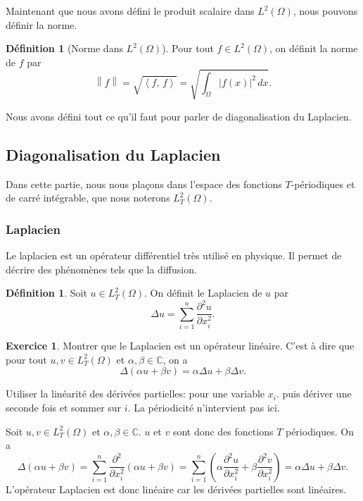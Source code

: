 \documentclass[11pt,a4paper]{article}
\numberwithin{equation}{section}
\theoremstyle{plain}
\theoremstyle{definition}
\newtheorem{definition}[theorem]{Définition}
\newtheorem{exercise}[theorem]{Exercice}
\theoremstyle{remark}
\newcommand{\C}{\mathbb{C}}
\newcommand{\norm}[1]{\left\lVert #1\right\rVert}
\newcommand{\ip}[2]{\left\langle #1,\, #2\right\rangle}
\newcommand{\Lap}{\Delta}
\begin{document}
Maintenant que nous avons défini le produit scalaire dans $L^2(\Omega)$, nous pouvons définir la norme.

\begin{definition}[Norme dans $L^2(\Omega)$]
Pour tout $f \in L^2(\Omega)$, on définit la norme de $f$ par
\[
    \norm{f} = \sqrt{\ip{f}{f}} = \sqrt{\int_\Omega |f(x)|^2 \, dx}.
\]
\end{definition}

Nous avons défini tout ce qu'il faut pour parler de diagonalisation du Laplacien.

\subsection{Diagonalisation du Laplacien}

Dans cette partie, nous nous plaçons dans l'espace des fonctions $T$-périodiques et de carré intégrable, que nous noterons $L^2_T(\Omega)$.

\subsubsection{Laplacien}

Le laplacien est un opérateur différentiel très utilisé en physique. Il permet de décrire des phénomènes tels que la diffusion.

\begin{definition}
    Soit $u \in L^2_T(\Omega)$. On définit le Laplacien de $u$ par
    \[
        \Lap u = \sum_{i=1}^n \frac{\partial^2 u}{\partial x_i^2}.
    \]
\end{definition}

\begin{exercise}
    Montrer que le Laplacien est un opérateur linéaire.
    C'est à dire que pour tout $u,v \in L^2_T(\Omega)$ et $\alpha,\beta \in \C$, on a
    \[
        \Lap(\alpha u + \beta v) = \alpha \Lap u + \beta \Lap v.
    \]
\end{exercise}

\begin{indication}
    Utiliser la linéarité des dérivées partielles: pour une variable $x_i$.
    puis dériver une seconde fois et sommer sur $i$.
    La périodicité n'intervient pas ici.
\end{indication}

\begin{solution}
    Soit $u,v \in L^2_T(\Omega)$ et $\alpha,\beta \in \C$. $u$ et $v$ sont donc des fonctions $T$ périodiques. On a
    \[
        \Lap(\alpha u + \beta v) = \sum_{i=1}^n \frac{\partial^2}{\partial x_i^2}(\alpha u + \beta v) = \sum_{i=1}^n \left( \alpha \frac{\partial^2 u}{\partial x_i^2} + \beta \frac{\partial^2 v}{\partial x_i^2} \right) = \alpha \Lap u + \beta \Lap v.
    \]
    L'opérateur Laplacien est donc linéaire car les dérivées partielles sont linéaires.
\end{solution}
\end{document}
